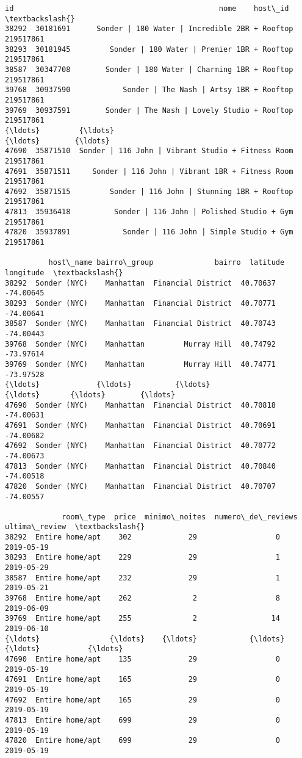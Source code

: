 \documentclass[11pt]{article}
\makeatletter
\newcommand{\boxspacing}{\kern\kvtcb@left@rule\kern\kvtcb@boxsep}
\newcommand{\prompt}[4]{
        {\ttfamily\llap{{\color{#2}[#3]:\hspace{3pt}#4}}\vspace{-\baselineskip}}
    }
\makeatother
\begin{document}
            \begin{tcolorbox}[breakable, size=fbox, boxrule=.5pt, pad at break*=1mm, opacityfill=0]
\prompt{Out}{outcolor}{247}{\boxspacing}
\begin{Verbatim}[commandchars=\\\{\}]
             id                                               nome    host\_id  \textbackslash{}
38292  30181691      Sonder | 180 Water | Incredible 2BR + Rooftop  219517861
38293  30181945         Sonder | 180 Water | Premier 1BR + Rooftop  219517861
38587  30347708        Sonder | 180 Water | Charming 1BR + Rooftop  219517861
39768  30937590            Sonder | The Nash | Artsy 1BR + Rooftop  219517861
39769  30937591        Sonder | The Nash | Lovely Studio + Rooftop  219517861
{\ldots}         {\ldots}                                                {\ldots}        {\ldots}
47690  35871510  Sonder | 116 John | Vibrant Studio + Fitness Room  219517861
47691  35871511     Sonder | 116 John | Vibrant 1BR + Fitness Room  219517861
47692  35871515         Sonder | 116 John | Stunning 1BR + Rooftop  219517861
47813  35936418          Sonder | 116 John | Polished Studio + Gym  219517861
47820  35937891            Sonder | 116 John | Simple Studio + Gym  219517861

          host\_name bairro\_group              bairro  latitude  longitude  \textbackslash{}
38292  Sonder (NYC)    Manhattan  Financial District  40.70637  -74.00645
38293  Sonder (NYC)    Manhattan  Financial District  40.70771  -74.00641
38587  Sonder (NYC)    Manhattan  Financial District  40.70743  -74.00443
39768  Sonder (NYC)    Manhattan         Murray Hill  40.74792  -73.97614
39769  Sonder (NYC)    Manhattan         Murray Hill  40.74771  -73.97528
{\ldots}             {\ldots}          {\ldots}                 {\ldots}       {\ldots}        {\ldots}
47690  Sonder (NYC)    Manhattan  Financial District  40.70818  -74.00631
47691  Sonder (NYC)    Manhattan  Financial District  40.70691  -74.00682
47692  Sonder (NYC)    Manhattan  Financial District  40.70772  -74.00673
47813  Sonder (NYC)    Manhattan  Financial District  40.70840  -74.00518
47820  Sonder (NYC)    Manhattan  Financial District  40.70707  -74.00557

             room\_type  price  minimo\_noites  numero\_de\_reviews ultima\_review  \textbackslash{}
38292  Entire home/apt    302             29                  0    2019-05-19
38293  Entire home/apt    229             29                  1    2019-05-29
38587  Entire home/apt    232             29                  1    2019-05-21
39768  Entire home/apt    262              2                  8    2019-06-09
39769  Entire home/apt    255              2                 14    2019-06-10
{\ldots}                {\ldots}    {\ldots}            {\ldots}                {\ldots}           {\ldots}
47690  Entire home/apt    135             29                  0    2019-05-19
47691  Entire home/apt    165             29                  0    2019-05-19
47692  Entire home/apt    165             29                  0    2019-05-19
47813  Entire home/apt    699             29                  0    2019-05-19
47820  Entire home/apt    699             29                  0    2019-05-19


\end{Verbatim}
\end{tcolorbox}
\end{document}
